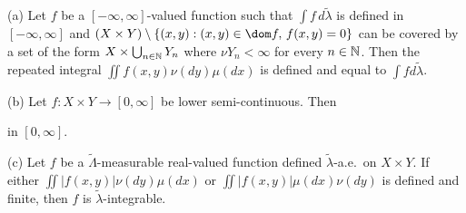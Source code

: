 (a) Let $f$ be a $[-\infty,\infty]$-valued function such
that $\int f\,d\tilde\lambda$ is defined in $[-\infty,\infty]$ and
$(X\times Y)\setminus\{(x,y):(x,y)\in\dom f,\,f(x,y)=0\}$
can be covered by a set of
the form $X\times\bigcup_{n\in\Bbb N}Y_n$ where $\nu Y_n<\infty$ for
every $n\in\Bbb N$.   Then the repeated integral
$\iint f(x,y)\nu(dy)\mu(dx)$ is defined and equal to
$\int fd\tilde\lambda$.

(b) Let $f:X\times Y\to[0,\infty]$ be lower semi-continuous.   Then


\noindent in $[0,\infty]$.

(c) Let $f$ be a $\tilde\Lambda$-measurable real-valued function defined
$\tilde\lambda$-a.e.\ on $X\times Y$.   If either
$\iint|f(x,y)|\nu(dy)\mu(dx)$ or $\iint|f(x,y)|\mu(dx)\nu(dy)$ is
defined and finite, then $f$ is $\tilde\lambda$-integrable.

